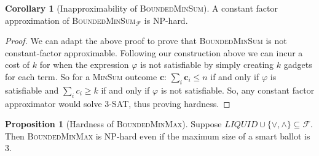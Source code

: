\documentclass[11pt,a4paper, titlepage]{article}
\theoremstyle{definition}
\newtheorem{corollary}[theorem]{Corollary}
\newtheorem{proposition}[theorem]{Proposition}
\let\vec\mathbf
\begin{document}
\begin{corollary}[Inapproximability of \textsc{BoundedMinSum}] A constant factor approximation of \textsc{BoundedMinSum}$_\mathcal{F}$ is NP-hard.    
\end{corollary}

\begin{proof}
    We can adapt the above proof to prove that \textsc{BoundedMinSum} is not constant-factor approximable. 
    Following our construction above we can incur a cost of $k$ for when the expression $\varphi$ is not satisfiable by simply creating $k$ gadgets for each term. 
    So for a \textsc{MinSum} outcome $\vec{c}$:   $\sum_i \vec{c}_i \leq n$ if and only if $\varphi$ is satisfiable and $\sum_i c_i \geq k$ if and only if $\varphi$ is not satisfiable. 
    So, any constant factor approximator would solve \textsc{3-SAT}, thus proving hardness.
\end{proof}

\begin{proposition}[Hardness of \textsc{BoundedMinMax}]
    Suppose $\mathit{LIQUID} \cup \{\lor, \land\} \subseteq \mathcal{F}$. Then \textsc{BoundedMinMax} is NP-hard even if the maximum size of a smart ballot is 3.    
\end{proposition}
\end{document}
